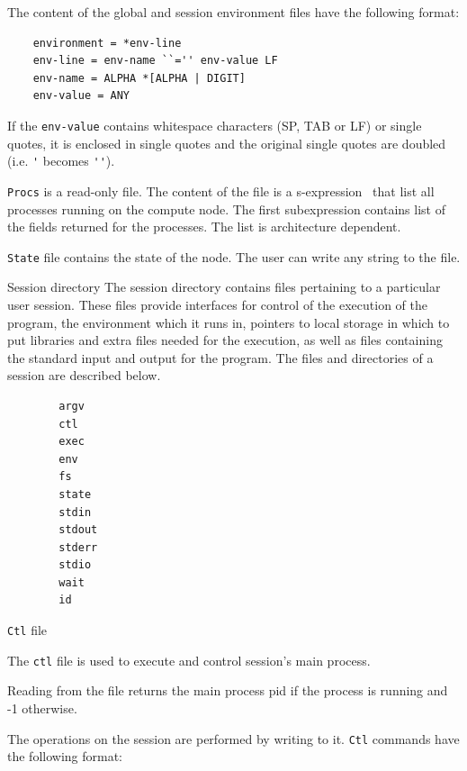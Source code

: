 \documentclass[11pt]{p9article}
\makeatletter
\renewcommand\section{\@startsection {section}{1}{\z@} {3pt} {1pt} {\normalfont\normalsize\bfseries}}
\renewcommand\subsection{\@startsection {subsection}{1}{\z@} {3pt} {1pt} {\normalfont\normalsize\bfseries}}
\makeatother
\begin{document}
The content of the global and session environment files have the following
format:

\begin{verbatim}
	environment = *env-line
	env-line = env-name ``='' env-value LF
	env-name = ALPHA *[ALPHA | DIGIT]
	env-value = ANY
\end{verbatim}

If the \verb|env-value| contains whitespace characters (SP, TAB or LF) or
single quotes, it is enclosed in single quotes and the original single
quotes are doubled (i.e. \verb|'| becomes \verb|''|).

\verb|Procs| is a read-only file. The content of the file is a s-expression~\cite{sexpr}
that list all processes running on the compute node. The first subexpression
contains list of the fields returned for the processes. The list is
architecture dependent.

\verb|State| file contains the state of the node. The user can write any
string to the file.  

\section{Session directory}
The session directory contains files pertaining to a particular
user session. These files provide interfaces for control of the
execution of the program, the environment which it runs in, pointers
to local storage in which to put libraries and extra files needed
for the execution, as well as files containing the standard input
and output for the program. The files and directories of a session are described below.

\begin{verbatim}
        argv
        ctl
        exec
        env
        fs
        state
        stdin
        stdout
        stderr
        stdio
        wait
        id
\end{verbatim}

\subsection{{\tt Ctl} file}

The \verb|ctl| file is used to execute and control session's main process.

Reading from the file returns the main process pid if the process is running
and -1 otherwise.

The operations on the session are performed by writing to it. \verb|Ctl|
commands have the following format:
\end{document}
